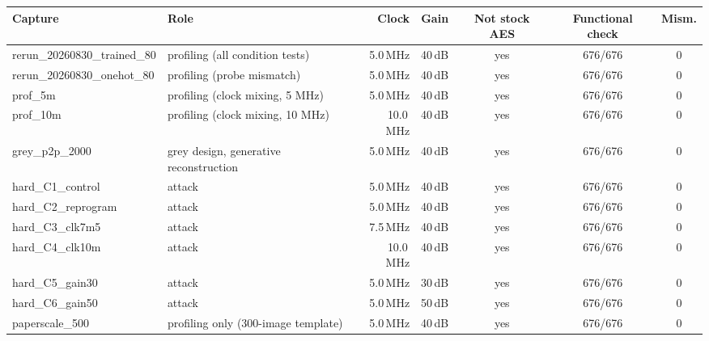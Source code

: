 \begin{tabular}{llrrccc}
\hline
Capture & Role & Clock & Gain & Not stock AES & Functional check & Mism. \\
\hline
rerun\_20260830\_trained\_80 & profiling (all condition tests) & 5.0\,MHz & 40\,dB & yes & 676/676 & 0 \\
rerun\_20260830\_onehot\_80 & profiling (probe mismatch) & 5.0\,MHz & 40\,dB & yes & 676/676 & 0 \\
prof\_5m & profiling (clock mixing, 5 MHz) & 5.0\,MHz & 40\,dB & yes & 676/676 & 0 \\
prof\_10m & profiling (clock mixing, 10 MHz) & 10.0\,MHz & 40\,dB & yes & 676/676 & 0 \\
grey\_p2p\_2000 & grey design, generative reconstruction & 5.0\,MHz & 40\,dB & yes & 676/676 & 0 \\
hard\_C1\_control & attack & 5.0\,MHz & 40\,dB & yes & 676/676 & 0 \\
hard\_C2\_reprogram & attack & 5.0\,MHz & 40\,dB & yes & 676/676 & 0 \\
hard\_C3\_clk7m5 & attack & 7.5\,MHz & 40\,dB & yes & 676/676 & 0 \\
hard\_C4\_clk10m & attack & 10.0\,MHz & 40\,dB & yes & 676/676 & 0 \\
hard\_C5\_gain30 & attack & 5.0\,MHz & 30\,dB & yes & 676/676 & 0 \\
hard\_C6\_gain50 & attack & 5.0\,MHz & 50\,dB & yes & 676/676 & 0 \\
paperscale\_500 & profiling only (300-image template) & 5.0\,MHz & 40\,dB & yes & 676/676 & 0 \\
\hline
\end{tabular}

